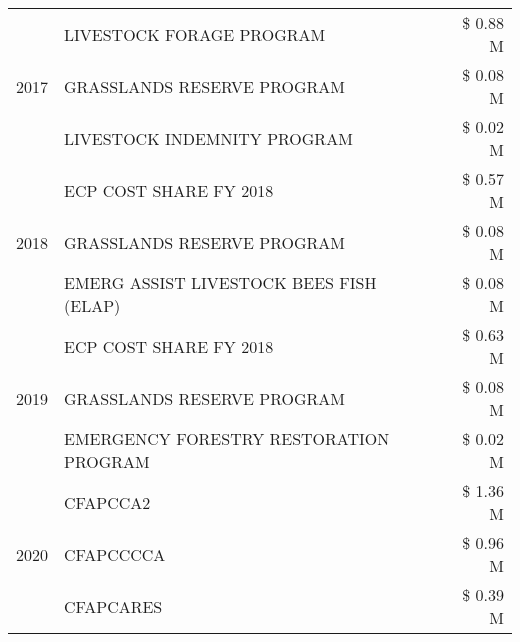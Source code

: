 \begin{tabular}{llr}
\cline{1-3}
\multirow[t]{3}{*}{2017} & LIVESTOCK FORAGE PROGRAM & \$ 0.88 M \\
 & GRASSLANDS RESERVE PROGRAM & \$ 0.08 M \\
 & LIVESTOCK INDEMNITY PROGRAM & \$ 0.02 M \\
\cline{1-3}
\multirow[t]{3}{*}{2018} & ECP COST SHARE FY 2018 & \$ 0.57 M \\
 & GRASSLANDS RESERVE PROGRAM & \$ 0.08 M \\
 & EMERG ASSIST LIVESTOCK BEES FISH (ELAP) & \$ 0.08 M \\
\cline{1-3}
\multirow[t]{3}{*}{2019} & ECP COST SHARE FY 2018 & \$ 0.63 M \\
 & GRASSLANDS RESERVE PROGRAM & \$ 0.08 M \\
 & EMERGENCY FORESTRY RESTORATION PROGRAM & \$ 0.02 M \\
\cline{1-3}
\multirow[t]{3}{*}{2020} & CFAPCCA2 & \$ 1.36 M \\
 & CFAPCCCCA & \$ 0.96 M \\
 & CFAPCARES & \$ 0.39 M \\
\cline{1-3}
\bottomrule
\end{tabular}
